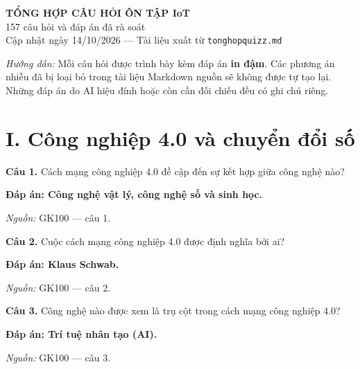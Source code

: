 \documentclass[11pt,a4paper]{article}
\begin{document}
\begin{center}
{\LARGE\bfseries TỔNG HỢP CÂU HỎI ÔN TẬP IoT}\\[8pt]
{\large 157 câu hỏi và đáp án đã rà soát}\\[4pt]
{\small Cập nhật ngày 14/10/2026 — Tài liệu xuất từ \texttt{tonghopquizz.md}}
\end{center}

\noindent\textit{Hướng dẫn:} Mỗi câu hỏi được trình bày kèm đáp án \textbf{in đậm}.
Các phương án nhiễu đã bị loại bỏ trong tài liệu Markdown nguồn sẽ không được tự tạo lại.
Những đáp án do AI hiệu đính hoặc còn cần đối chiếu đều có ghi chú riêng.

\tableofcontents
\bigskip

\section*{I. Công nghiệp 4.0 và chuyển đổi số}

\textbf{Câu 1.} Cách mạng công nghiệp 4.0 đề cập đến sự kết hợp giữa công nghệ nào?\par
{\color{answer}\textbf{Đáp án: Công nghệ vật lý, công nghệ số và sinh học.}}\par
{\footnotesize\color{sourcegray}\textit{Nguồn:} GK100 — câu 1.\par}
\vspace{3pt}\par\noindent{\color{black!18}\rule{\linewidth}{0.3pt}}\par\medskip

\textbf{Câu 2.} Cuộc cách mạng công nghiệp 4.0 được định nghĩa bởi ai?\par
{\color{answer}\textbf{Đáp án: Klaus Schwab.}}\par
{\footnotesize\color{sourcegray}\textit{Nguồn:} GK100 — câu 2.\par}
\vspace{3pt}\par\noindent{\color{black!18}\rule{\linewidth}{0.3pt}}\par\medskip

\textbf{Câu 3.} Công nghệ nào được xem là trụ cột trong cách mạng công nghiệp 4.0?\par
{\color{answer}\textbf{Đáp án: Trí tuệ nhân tạo (AI).}}\par
{\footnotesize\color{sourcegray}\textit{Nguồn:} GK100 — câu 3.\par}
\vspace{3pt}\par\noindent{\color{black!18}\rule{\linewidth}{0.3pt}}\par\medskip
\end{document}

